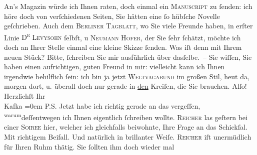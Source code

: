\begin{ledgroupsized}[t]{13cm}
           \pstart
           An’s Magazin würde ich Ihnen raten, doch einmal ein
                  \textsc{Manuscript} zu ſenden: ich höre doch von verſchiedenen
               Seiten, Sie hätten eine ſo hübſche Novelle geſchrieben. Auch dem {\pb}\textsc{Berliner Tagblatt}, wo Sie viele Freunde haben, in erſter Linie \textsc{D\textsuperscript{r}{ }Levysohn}{ }ſelbſt, u \textsc{Neumann Hofer}, der Sie ſehr ſchätzt, möchte ich doch an Ihrer Stelle einmal eine kleine
               Skizze ſenden.\pend
           \pstart
           Was iſt denn mit Ihrem neuen Stück? Bitte, ſchreiben Sie mir ausführlich über
               dasſelbe. – Sie wiſſen, Sie haben einen aufrichtigen, guten Freund in mir: vielleicht
               kann ich Ihnen irgendwie behilflich ſein: ich bin ja jetzt \textsc{Weltvagabund} im großen Stil, heut da, morgen dort, u. überall doch nur
               gerade in \uline{den} Kreiſen, die Sie brauchen. Alſo!\pend
           \pstart
           Herzlichſt Ihr{\\[\baselineskip]}\spacefill\mbox{Kafka}\pend
           \leftskip=0em{}\pstart
           \noindent{}{\pb}\textsc{P.S.}\pend
           \pstart
           Jetzt habe ich richtig gerade an das vergeſſen, \substVorne{}\textsuperscript{warum}\substDazwischen{}deſſentwegen\substHinten{} ich Ihnen eigentlich ſchreiben wollte.\pend
           \pstart
           \textsc{Reicher} las geſtern bei einer \textsc{Soiree} hier, welcher ich
                  gleichfalls beiwohnte, Ihre Frage an das
                     Schickſal. Mit richtigem Beifall. Und natürlich in brillanter Weiſe. \textsc{Reicher} iſt unermüdlich für Ihren Ruhm thätig. Sie ſollten ihm doch wieder mal

\end{ledgroupsized}
